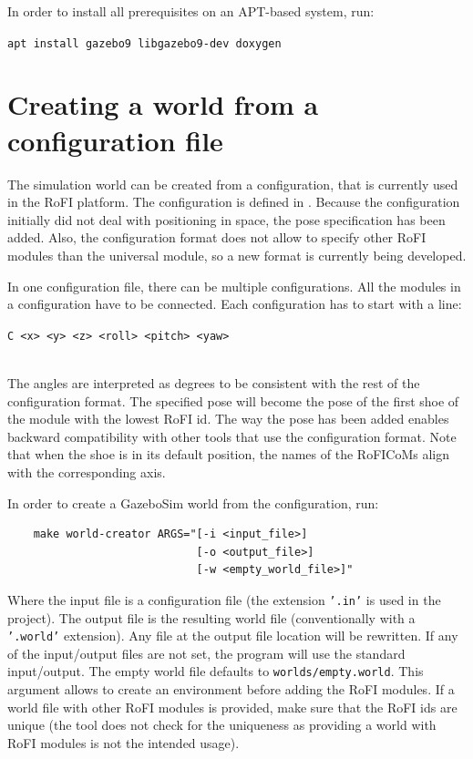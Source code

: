 \documentclass[
  printed, %
  color,   %
  notable, %
  oneside, %
  nolof,   %
  nolot,   %
  nocover,
]{fithesis3}
\newcommand{\code}[1]{\texttt{#1}}
\begin{document}
In order to install all prerequisites on an APT-based system, run:\\
\centerline{\code{apt install gazebo9 libgazebo9-dev doxygen}}

\section{Creating a world from a configuration file}

The simulation world can be created from a configuration, that is currently used in the RoFI platform.
The configuration is defined in \cite[p. 71]{motion-planning-thesis}.
Because the configuration initially did not deal with positioning in space, the pose specification has been added.
Also, the configuration format does not allow to specify other RoFI modules than the universal module, so a new format is currently being developed.

In one configuration file, there can be multiple configurations.
All the modules in a configuration have to be connected.
Each configuration has to start with a line:\\
\centerline{\code{C <x> <y> <z> <roll> <pitch> <yaw>}}\\
The angles are interpreted as degrees to be consistent with the rest of the configuration format.
The specified pose will become the pose of the first shoe of the module with the lowest RoFI id.
The way the pose has been added enables backward compatibility with other tools that use the configuration format.
Note that when the shoe is in its default position, the names of the RoFICoMs align with the corresponding axis.

In order to create a GazeboSim world from the configuration, run:
\begin{center}
\begin{verbatim}
    make world-creator ARGS="[-i <input_file>]
                             [-o <output_file>]
                             [-w <empty_world_file>]"
\end{verbatim}
\end{center}
Where the input file is a configuration file (the extension \code{'.in'} is used in the project).
The output file is the resulting world file (conventionally with a \code{'.world'} extension).
Any file at the output file location will be rewritten.
If any of the input/output files are not set, the program will use the standard input/output.
The empty world file defaults to \code{worlds/empty.world}.
This argument allows to create an environment before adding the RoFI modules.
If a world file with other RoFI modules is provided, make sure that the RoFI ids are unique (the tool does not check for the uniqueness as providing a world with RoFI modules is not the intended usage).
\end{document}
